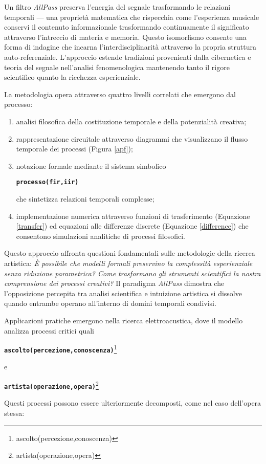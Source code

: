 \documentclass[12pt,a4paper]{article}
\newcommand{\apf}[3]{\textbf{\texttt{#1(#2,#3)}}}
\newcommand{\apfc}[3]{\begin{center}\apf{#1}{#2}{#3}\end{center}}
\newcommand{\apfcn}[4]{\begin{center}\apf{#1}{#2}{#3}\footnote{#4}\end{center}}
\begin{document}
Un filtro \emph{AllPass} preserva l'energia del segnale trasformando le relazioni temporali — una proprietà matematica che rispecchia come l'esperienza musicale conservi il contenuto informazionale trasformando continuamente il significato attraverso l'intreccio di materia e memoria. Questo isomorfismo consente una forma di indagine che incarna l'interdisciplinarità attraverso la propria struttura auto-referenziale. L'approccio estende tradizioni provenienti dalla cibernetica e teoria del segnale nell'analisi fenomenologica mantenendo tanto il rigore scientifico quanto la ricchezza esperienziale.

La metodologia opera attraverso quattro livelli correlati che emergono dal processo:
\begin{enumerate}[nosep]
  \item analisi filosofica della costituzione temporale e della potenzialità creativa;
  \item rappresentazione circuitale attraverso diagrammi che visualizzano il flusso temporale dei processi (Figura \ref{apf});
  \item notazione formale mediante il sistema simbolico
    \apfc{processo}{fir}{iir}
    che sintetizza relazioni temporali complesse;
  \item implementazione numerica attraverso funzioni di trasferimento (Equazione \ref{transfer}) ed equazioni alle differenze discrete (Equazione \ref{difference}) che consentono simulazioni analitiche di processi filosofici.
\end{enumerate}

Questo approccio affronta questioni fondamentali sulle metodologie della ricerca artistica: \textit{È possibile che modelli formali preservino la complessità esperienziale senza riduzione parametrica? Come trasformano gli strumenti scientifici la nostra comprensione dei processi creativi?} Il paradigma \emph{AllPass} dimostra che l'opposizione percepita tra analisi scientifica e intuizione artistica si dissolve quando entrambe operano all'interno di domini temporali condivisi.

Applicazioni pratiche emergono nella ricerca elettroacustica, dove il modello analizza processi critici quali

\apfcn{ascolto}{percezione}{conoscenza}{ascolto(percezione,conoscenza)}

e

\apfcn{artista}{operazione}{opera}{artista(operazione,opera)}

Questi processi possono essere ulteriormente decomposti, come nel caso dell'opera stessa:
\end{document}
